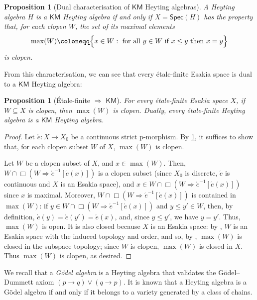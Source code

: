 \documentclass[12pt]{amsart}
\theoremstyle{plain}
\newtheorem{proposition}[theorem]{Proposition}
\theoremstyle{definition}
\newcommand{\KM}{\mathsf{KM}}
\newcommand{\Spec}{\mathsf{Spec}}
\newcommand{\climp}{\Rightarrow}
\begin{document}
\begin{proposition}[Dual characterisation of $\KM$ Heyting algebras]\label{prop: characterisation of KM}
    A Heyting algebra $H$ is a $\KM$ Heyting algebra if and only if $X=\Spec(H)$ has the property that, for each clopen $W$, the set of its maximal elements
    \[
    \max(W) \coloneqq \Bigl\{x\in W : \text{ for all } y \in W \text{ if }x\leq y \text{ then } x = y\Bigr\}
    \]
    is clopen.
\end{proposition}

From this characterisation, we can see that every étale-finite Esakia space is dual to a $\KM$ Heyting algebra:

\begin{proposition}[\'Etale-finite $\Rightarrow$ $\KM$]\label{prop: etale-finite yields KM}
    For every étale-finite Esakia space $X$, if $W\subseteq X$ is clopen, then $\max (W)$ is clopen. 
    Dually, every étale-finite Heyting algebra is a $\KM$ Heyting algebra.
\end{proposition}
\begin{proof}
    Let $\acute{e}\colon X\to X_{0}$ be a continuous strict p-morphism. By \cref{prop: characterisation of KM}, it suffices to show that, for each clopen subset $W$ of $X$, $\max(W)$ is clopen.
    
    Let $W$ be a clopen subset of $X$, and $x\in \max(W)$. Then, $W\cap \Box(W\climp \acute{e}^{-1}[\acute{e}(x)])$ is a clopen subset (since $X_0$ is discrete, $\acute{e}$ is continuous and $X$ is an Esakia space), and $x\in W\cap \Box(W\climp \acute{e}^{-1}[\acute{e}(x)])$ since $x$ is maximal. Moreover, $W \cap \Box(W\climp \acute{e}^{-1}[\acute{e}(x)])$ is contained in $\max(W)$: if $y \in W \cap \Box(W\climp \acute{e}^{-1}[\acute{e}(x)])$ and $y\leq y'\in W$, then, by definition, $\acute{e}(y)=\acute{e}(y')=\acute{e}(x)$, and, since $y\leq y'$, we have $y=y'$. Thus, $\max(W)$ is open. It is also closed because $X$ is an Esakia space: by \cite[Thm.~3.2.6]{Esakiach2019HeyAlg}, $W$ is an Esakia space with the induced topology and order, and so, by \cite[Thm.~3.2.3]{Esakiach2019HeyAlg}, $\max(W)$ is closed in the subspace topology; since $W$ is clopen, $\max(W)$ is closed in $X$. Thus $\max(W)$ is clopen, as desired.
\end{proof}

We recall that a \emph{Gödel algebra} is a Heyting algebra that validates the Gödel--Dummett axiom $(p\rightarrow q)\vee (q\rightarrow p)$.
It is known that a Heyting algebra is a Gödel algebra if and only if it belongs to a variety generated by a class of chains.
\end{document}
